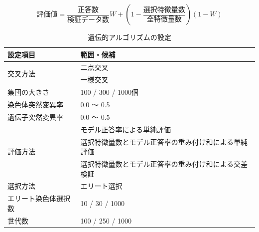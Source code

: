 \begin{equation}
    評価値 = \frac{正答数}{検証データ数} W + (1 - \frac{選択特徴量数}{全特徴量数}) (1 - W)
\end{equation}

\begin{table}[t]
    \caption{遺伝的アルゴリズムの設定}
    \centering
    \begin{tabular}{ll}
        \hline
        設定項目 & 範囲・候補 \\ \hline\hline
        \multirow{2}{*}{交叉方法} & 二点交叉 \\
        & 一様交叉 \\ \hline
        集団の大きさ & 100 / 300 / 1000個 \\ \hline
        染色体突然変異率 & 0.0 〜 0.5 \\ \hline
        遺伝子突然変異率 & 0.0 〜 0.5 \\ \hline
        \multirow{3}{*}{評価方法} & モデル正答率による単純評価 \\
        & 選択特徴量数とモデル正答率の重み付け和による単純評価 \\
        & 選択特徴量数とモデル正答率の重み付け和による交差検証 \\ \hline
        選択方法 & エリート選択 \\ \hline
        エリート染色体選択数 & 10 / 30 / 1000 \\ \hline
        世代数 & 100 / 250 / 1000 \\ \hline
    \end{tabular}
    \label{tab:ga_setting}
\end{table}
